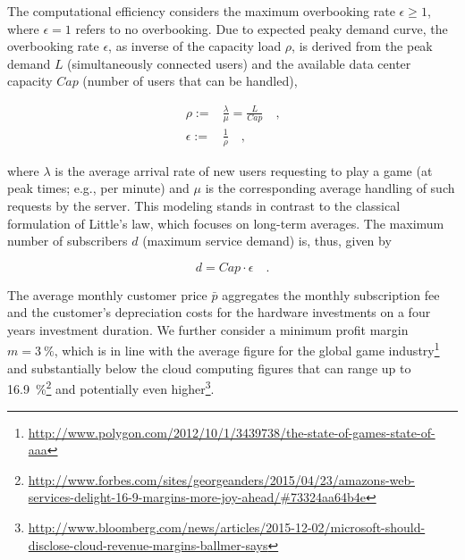 The computational efficiency considers the maximum overbooking rate $\epsilon \geq 1$, where $\epsilon = 1$ refers to no overbooking. Due to expected peaky demand curve, the overbooking rate $\epsilon$, as inverse of the capacity load $\rho$, is derived from the peak demand $L$ (simultaneously connected users) and the available data center capacity $Cap$ (number of users that can be handled),

\begin{align}
	\rho :=& \frac{\lambda}{\mu} = \frac{L}{Cap} \quad\text{,} \\
	\epsilon :=& \frac{1}{\rho} \quad\text{,}
\end{align}

where $\lambda$ is the average arrival rate of new users requesting to play a game (at peak times; e.g., per minute) and $\mu$ is the corresponding average handling of such requests by the server. This modeling stands in contrast to the classical formulation of Little's law, which focuses on long-term averages. The maximum number of subscribers $d$ (maximum service demand) is, thus, given by

\begin{equation}
	 d = Cap \cdot \epsilon \quad \text{.}
\end{equation}

The average monthly customer price $\bar{p}$ aggregates the monthly subscription fee and the customer's depreciation costs for the hardware investments on a four years investment duration. We further consider a minimum profit margin $m = \SI{3}{\percent}$, which is in line with the average figure for the global game industry\footnote{\url{http://www.polygon.com/2012/10/1/3439738/the-state-of-games-state-of-aaa}} and substantially below the cloud computing figures that can range up to \SI{16.9}{\percent}\footnote{\url{http://www.forbes.com/sites/georgeanders/2015/04/23/amazons-web-services-delight-16-9-margins-more-joy-ahead/\#73324aa64b4e}} and potentially even higher\footnote{\url{http://www.bloomberg.com/news/articles/2015-12-02/microsoft-should-disclose-cloud-revenue-margins-ballmer-says}}.


